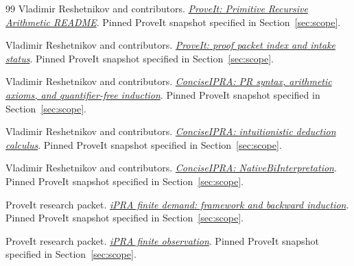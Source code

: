 \begin{thebibliography}{99}
\small
\setlength{\itemsep}{.45em}
 Vladimir Reshetnikov and contributors.
\href{https://github.com/VladimirReshetnikov/ProveIt/blob/bb86091690bc4f920f046a37cfc87719299b4019/Logic/PrimitiveRecursiveArithmetic/README.md}{\emph{ProveIt: Primitive Recursive Arithmetic README}}.
Pinned ProveIt snapshot specified in Section~\ref{sec:scope}.

 Vladimir Reshetnikov and contributors.
\href{https://github.com/VladimirReshetnikov/ProveIt/blob/bb86091690bc4f920f046a37cfc87719299b4019/Logic/PrimitiveRecursiveArithmetic/docs/proofs/README.md}{\emph{ProveIt: proof packet index and intake status}}.
Pinned ProveIt snapshot specified in Section~\ref{sec:scope}.

 Vladimir Reshetnikov and contributors.
\href{https://github.com/VladimirReshetnikov/ProveIt/blob/bb86091690bc4f920f046a37cfc87719299b4019/Logic/PrimitiveRecursiveArithmetic/ConciseIPRA/Lean/ConciseIPRA/PR.lean}{\emph{ConciseIPRA: PR syntax, arithmetic axioms, and quantifier-free induction}}.
Pinned ProveIt snapshot specified in Section~\ref{sec:scope}.

 Vladimir Reshetnikov and contributors.
\href{https://github.com/VladimirReshetnikov/ProveIt/blob/bb86091690bc4f920f046a37cfc87719299b4019/Logic/PrimitiveRecursiveArithmetic/ConciseIPRA/Lean/ConciseIPRA/Deduction.lean}{\emph{ConciseIPRA: intuitionistic deduction calculus}}.
Pinned ProveIt snapshot specified in Section~\ref{sec:scope}.

 Vladimir Reshetnikov and contributors.
\href{https://github.com/VladimirReshetnikov/ProveIt/blob/bb86091690bc4f920f046a37cfc87719299b4019/Logic/PrimitiveRecursiveArithmetic/ConciseIPRA/Lean/ConciseIPRA/NativeBiInterpretation.lean}{\emph{ConciseIPRA: NativeBiInterpretation}}.
Pinned ProveIt snapshot specified in Section~\ref{sec:scope}.

 ProveIt research packet.
\href{https://github.com/VladimirReshetnikov/ProveIt/blob/bb86091690bc4f920f046a37cfc87719299b4019/Logic/PrimitiveRecursiveArithmetic/docs/proofs/foundations/ipra_finite_demand/README.md}{\emph{iPRA finite demand: framework and backward induction}}.
Pinned ProveIt snapshot specified in Section~\ref{sec:scope}.

 ProveIt research packet.
\href{https://github.com/VladimirReshetnikov/ProveIt/blob/bb86091690bc4f920f046a37cfc87719299b4019/Logic/PrimitiveRecursiveArithmetic/docs/proofs/foundations/ipra_finite_observation/README.txt}{\emph{iPRA finite observation}}.
Pinned ProveIt snapshot specified in Section~\ref{sec:scope}.


\end{thebibliography}

